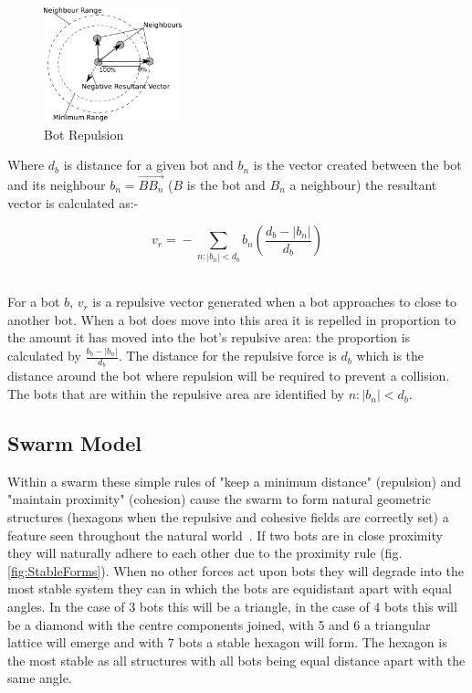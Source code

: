 \documentclass[10pt,journal,letterpaper,twoside]{IEEEtran}
\newcommand{\Fig}{fig.}
\begin{document}
\begin{figure}[H]
\begin{center}
\includegraphics[width=4cm]{figures/Repulsion1}
\caption{Bot Repulsion \label{methods:Repulsion1}}
\end{center}
\end{figure}

Where $d_b$ is distance for a given bot and $b_n$ is the vector
created between the bot and its neighbour $b_n =‎
\overrightarrow{BB_n}$ ($B$ is the bot and $B_n$ a neighbour) the
resultant vector is calculated as:-

\begin{equation}
\label{eq:Repulsion1}
v_{r} =‎ - \sum_{n:|b_n| < d_b^{}} {b_n} \left ( \frac{d_b - |b_n|}{d_b} \right )
\end{equation}‎

For a bot $b$, $v_{r}$ is a repulsive vector generated when a bot
approaches to close to another bot. When a bot does move into this
area it is repelled in proportion to the amount it has moved into the
bot's repulsive area: the proportion is calculated by $\frac{b_{b} -
  |b_{n}|}{d_b}$. The distance for the repulsive force is $d_b$ which
is the distance around the bot where repulsion will be required to
prevent a collision. The bots that are within the repulsive area are
identified by ${n:|b_{n}| < d_b}$.

\subsection{Swarm Model}

Within a swarm these simple rules of "keep a minimum distance"
(repulsion) and "maintain proximity" (cohesion) cause the swarm to
form natural geometric structures (hexagons when the repulsive and
cohesive fields are correctly set) a feature seen throughout the
natural world~\cite{ALMC13}.  If two bots are in close proximity they
will naturally adhere to each other due to the proximity rule (\Fig{}
\ref{fig:StableForms}). When no other forces act upon bots they will
degrade into the most stable system they can in which the bots are
equidistant apart with equal angles.  In the case of 3 bots this will
be a triangle, in the case of 4 bots this will be a diamond with the
centre components joined, with 5 and 6 a triangular lattice will
emerge and with 7 bots a stable hexagon will form. The hexagon is the
most stable as all structures with all bots being equal distance apart
with the same angle.
\end{document}
